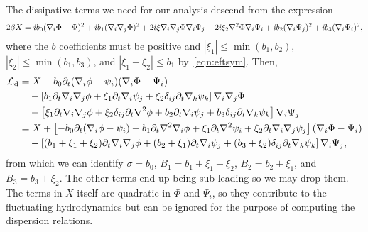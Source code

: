 The dissipative terms we need for our analysis descend from the expression
\begin{align}
2\beta X = i b_0(\nabla_i\Phi - \Psi)^2 + i b_1(\nabla_i\nabla_j\Phi)^2 + 2i\xi \nabla_i\nabla_j\Phi \nabla_i\Psi_j + 2i\xi_2 \nabla^2\Phi \nabla_i\Psi_i + ib_2 (\nabla_i\Psi_j)^2 + ib_3(\nabla_i\Psi_i)^2,
\end{align}
where the $b$ coefficients must be positive and $|\xi_1| \le \min(b_1,b_2)$, $|\xi_2| \le \min(b_1,b_3)$, and $|\xi_1+\xi_2| \le b_1$ by~\eqref{eqn:eftsym}. Then,
\begin{align}
\mathcal{L}_\text{d} &= X - b_0\partial_t(\nabla_i\phi - \psi_i)(\nabla_i\Phi - \Psi_i) \nonumber\\
&\quad - \left[ b_1 \partial_t \nabla_i\nabla_j\phi + \xi_1\partial_t \nabla_i\psi_j + \xi_2 \delta_{ij}\partial_t\nabla_k\psi_k \right] \nabla_i\nabla_j \Phi \nonumber\\
&\quad -\left[ \xi_1\partial_t\nabla_i\nabla_j\phi + \xi_2\delta_{ij} \partial_t \nabla^2\phi + b_2\partial_t\nabla_i\psi_j + b_3\delta_{ij} \partial_t\nabla_k\psi_k \right] \nabla_i\Psi_j\nonumber\\
&= X + \left[ - b_0\partial_t(\nabla_i\phi - \psi_i) + b_1\partial_t\nabla^2\nabla_i\phi + \xi_1\partial_t\nabla^2\psi_i + \xi_2\partial_t\nabla_i\nabla_j\psi_j \right](\nabla_i\Phi - \Psi_i) \nonumber\\
&\quad -\left[ (b_1+\xi_1+\xi_2) \partial_t\nabla_i\nabla_j\phi + (b_2+\xi_1) \partial_t\nabla_i\psi_j + (b_3+\xi_2) \delta_{ij} \partial_t\nabla_k\psi_k \right] \nabla_i\Psi_j,
\end{align}
from which we can identify $\sigma=b_0$, $B_1 = b_1+\xi_1+\xi_2$, $B_2 = b_2+\xi_1$, and $B_3 = b_3+\xi_2$. The other terms end up being sub-leading so we may drop them. The terms in $X$ itself are quadratic in $\Phi$ and $\Psi_i$, so they contribute to the fluctuating hydrodynamics but can be ignored for the purpose of computing the dispersion relations.
